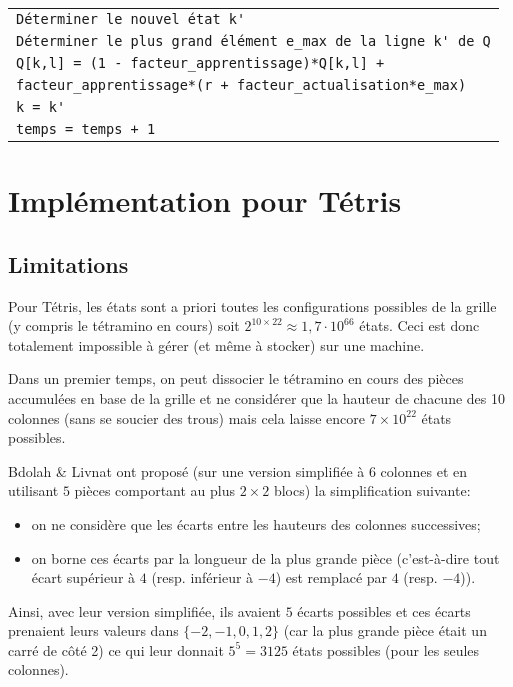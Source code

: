 \begin{tabular}{|l|}
	\hspace{1cm} \verb|Déterminer le nouvel état k'| \\ 
	\hspace{1cm} \verb|Déterminer le plus grand élément e_max de la ligne k' de Q| \\
	\hspace{1cm} \verb|Q[k,l] = (1 - facteur_apprentissage)*Q[k,l] +| \\
	\hfill \verb|facteur_apprentissage*(r + facteur_actualisation*e_max)| \\
	\hspace{1cm} \verb|k = k'| \\
	\hspace{1cm} \verb|temps = temps + 1| \\
	\hline
\end{tabular}  

\section{Implémentation pour Tétris}

\subsection{Limitations}

Pour Tétris, les états sont a priori toutes les configurations possibles de la grille (y compris le tétramino en cours) soit $2^{10\times 22} \approx 1{,}7\cdot10^{66}$ états. Ceci est donc totalement impossible à gérer (et même à stocker) sur une machine.

\bigskip

Dans un premier temps, on peut dissocier le tétramino en cours des pièces accumulées en base de la grille et ne considérer que la hauteur de chacune des 10 colonnes (sans se soucier des trous) mais cela laisse encore $7\times10^{22}$ états possibles. 

Bdolah \& Livnat \cite{BL00} ont proposé (sur une version simplifiée à $6$ colonnes et en utilisant $5$ pièces comportant au plus $2\times 2$ blocs) la simplification suivante:
\begin{itemize}
	\item on ne considère que les écarts entre les hauteurs des colonnes successives;
	\item on borne ces écarts par la longueur de la plus grande pièce (c'est-à-dire tout écart supérieur à $4$ (resp. inférieur à $-4$) est remplacé par $4$ (resp. $-4$)).
\end{itemize}
Ainsi, avec leur version simplifiée, ils avaient $5$ écarts possibles et ces écarts prenaient leurs valeurs dans $\{-2, -1, 0, 1, 2\}$ (car la plus grande pièce était un carré de côté 2) ce qui leur donnait $5^5=3125$ états possibles (pour les seules colonnes).

